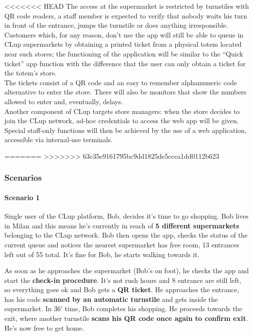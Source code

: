 <<<<<<< HEAD
The access at the supermarket is restricted by turnstiles with QR code readers, a staff member is expected to verify that nobody waits his turn in front of the entrance, jumps the turnstile or does anything irresponsible.\\
Customers which, for any reason, don’t use the app will still be able to queue in CLup supermarkets by obtaining a printed ticket from a physical totem located near such stores; the functioning of the application will be similar to the “Quick ticket” app function with the difference that the user can only obtain a ticket for the totem’s store. \\
The tickets consist of a QR code and an easy to remember alphanumeric code alternative to enter the store. There will also be monitors that show the numbers allowed to enter and, eventually, delays.\\
Another component of CLup targets store managers: when the store decides to join the CLup network, ad-hoc credentials to access the web app will be given. Special staff-only functions will then be achieved by the use of a web application, accessible via internal-use terminals.

=======
>>>>>>> 63c35e9161795bc9dd1825de5ccca1dd0112b623
\subsubsection{Scenarios}
\paragraph{Scenario 1}

Single user of the CLup platform, Bob, decides it's time to go shopping.
Bob lives in Milan and this means he's currently in reach of \textbf{5 different supermarkets} belonging to the CLup network. \newline
Bob then opens the app, checks the status of the current queue and notices the nearest supermarket has free room, 13 entrances left out of 55 total. It's fine for Bob, he starts walking towards it.

As soon as he approaches the supermarket (Bob's on foot), he checks the app and start the \textbf{check-in procedure}. It's not rush hours and 8 entrance are still left, so everything goes ok and Bob gets a \textbf{QR ticket}. He approaches the entrance, has his code \textbf{scanned by an automatic turnstile} and gets inside the supermarket.\newline
In 36' time, Bob completes his shopping. He proceeds towards the exit, where another turnstile \textbf{scans his QR code once again to confirm exit}. He's now free to get home.

